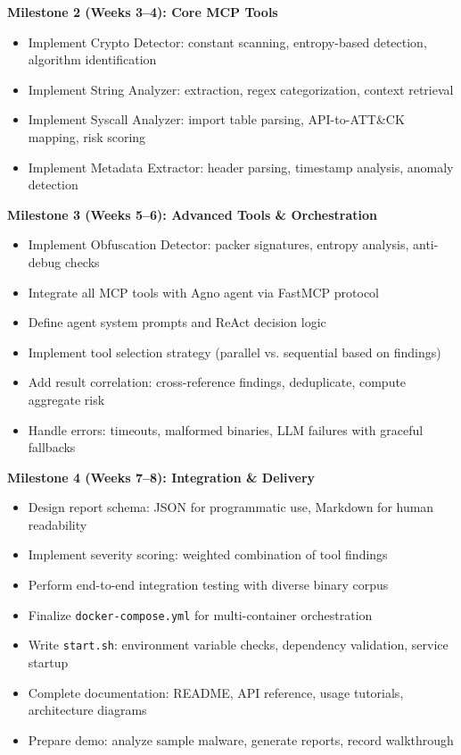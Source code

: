 \documentclass[11pt,a4paper]{article}
\begin{document}
\noindent\textbf{Milestone 2 (Weeks 3--4): Core MCP Tools}
\begin{itemize}
  \item Implement Crypto Detector: constant scanning, entropy-based detection, algorithm identification
  \item Implement String Analyzer: extraction, regex categorization, context retrieval
  \item Implement Syscall Analyzer: import table parsing, API-to-ATT\&CK mapping, risk scoring
  \item Implement Metadata Extractor: header parsing, timestamp analysis, anomaly detection
\end{itemize}

\noindent\textbf{Milestone 3 (Weeks 5--6): Advanced Tools \& Orchestration}
\begin{itemize}
  \item Implement Obfuscation Detector: packer signatures, entropy analysis, anti-debug checks
  \item Integrate all MCP tools with Agno agent via FastMCP protocol
  \item Define agent system prompts and ReAct decision logic
  \item Implement tool selection strategy (parallel vs. sequential based on findings)
  \item Add result correlation: cross-reference findings, deduplicate, compute aggregate risk
  \item Handle errors: timeouts, malformed binaries, LLM failures with graceful fallbacks
\end{itemize}

\noindent\textbf{Milestone 4 (Weeks 7--8): Integration \& Delivery}
\begin{itemize}
  \item Design report schema: JSON for programmatic use, Markdown for human readability
  \item Implement severity scoring: weighted combination of tool findings
  \item Perform end-to-end integration testing with diverse binary corpus
  \item Finalize \texttt{docker-compose.yml} for multi-container orchestration
  \item Write \texttt{start.sh}: environment variable checks, dependency validation, service startup
  \item Complete documentation: README, API reference, usage tutorials, architecture diagrams
  \item Prepare demo: analyze sample malware, generate reports, record walkthrough
\end{itemize}
\end{document}
